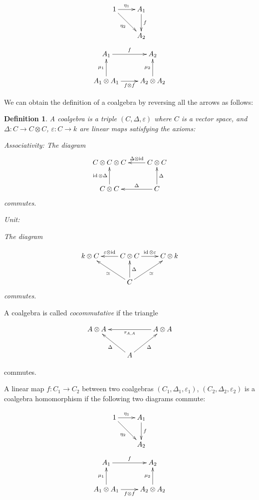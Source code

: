 \documentclass[]{article}
\newtheorem{defn}[theorem]{Definition}
\newcommand{\id}{\operatorname{id}}
\numberwithin{equation}{subsection}
\begin{document}
\begin{equation}
    \xymatrix{
    1 \ar[r]^-{\eta_1} \ar[rd]_{\eta_2} & A_1 \ar[d]^-f \\
    & A_2
    }
\end{equation}
\begin{equation}
    \xymatrix{
    A_1 \ar[r]^-f & A_2 \\
    A_1 \otimes A_1 \ar[u]^-{\mu_1} \ar[r]_-{f\otimes f} & A_2 \otimes A_2 \ar[u]^-{\mu_2}
    }
\end{equation}


We can obtain the definition of a coalgebra by reversing all the arrows as follows:

\begin{defn}
    A \emph{coalgebra} is a triple $(C, \Delta, \varepsilon)$ where $C$ is a
    vector space, and $\Delta: C \to C \otimes C$, $\varepsilon: C \to k$ are
    linear maps satisfying the axioms:

Associativity:
The diagram
\begin{equation}
\xymatrix{
C \otimes C \otimes C   & C \otimes C \ar[l]_-{\Delta \otimes \id}\\
 C \otimes C\ar[u]^-{\id \otimes \Delta}  & C \ar[l]_-\Delta \ar[u]_-{\Delta}
}
\end{equation}
commutes.

Unit: 

The diagram

\begin{equation}
    \xymatrix{
    k \otimes C  & C \otimes C \ar[l]_-{\varepsilon \otimes \id} \ar[r]^-{\id \otimes \varepsilon} & C \otimes k   \\
    & C \ar[u]_-\Delta \ar[lu]^-\simeq \ar[ru]_-{\simeq}&
    }
\end{equation}
commutes.
\end{defn}
A coalgebra is called \emph{cocommutative} if the triangle 

\begin{equation}
    \xymatrix{
    A \otimes A   & & A \ar[ll]^-{\tau_{A,A}} \otimes A  \\
    & \ar[lu]^-\Delta A \ar[ru]_-\Delta&
    }
\end{equation}

commutes.

A linear map $f: C_1 \to C_2$ between two coalgebras $(C_1, \Delta_1, \varepsilon_1)$, $(C_2, \Delta_2, \varepsilon_2)$ is a coalgebra homomorphism if the following two diagrams commute: 


\begin{equation}
    \xymatrix{
    1 \ar[r]^-{\eta_1} \ar[rd]_{\eta_2} & A_1 \ar[d]^-f \\
    & A_2
    }
\end{equation}
\begin{equation}
    \xymatrix{
    A_1 \ar[r]^-f & A_2 \\
    A_1 \otimes A_1 \ar[u]^-{\mu_1} \ar[r]_-{f\otimes f} & A_2 \otimes A_2 \ar[u]^-{\mu_2}
    }
\end{equation}
\end{document}

